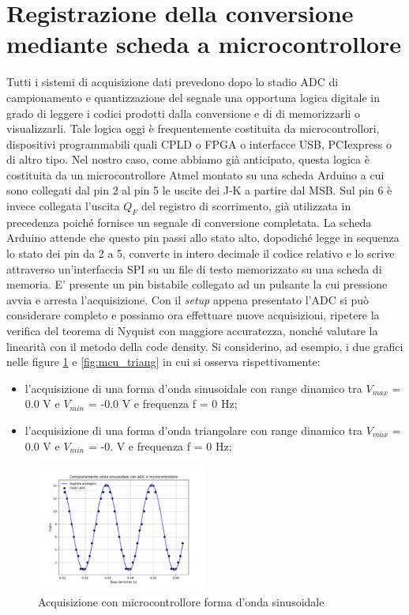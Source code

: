 \documentclass[journal]{IEEEtran}
\begin{document}
\section{Registrazione della conversione mediante scheda a microcontrollore}
Tutti i sistemi di acquisizione dati prevedono dopo lo stadio ADC di campionamento e quantizzazione del segnale una opportuna logica digitale in grado di leggere i codici prodotti dalla conversione e di di memorizzarli o visualizzarli. Tale logica oggi è frequentemente costituita da microcontrollori, dispositivi programmabili quali CPLD o FPGA o interfacce USB, PCIexpress o di altro tipo. Nel nostro caso, come abbiamo già anticipato, questa logica è costituita da un microcontrollore Atmel montato su una scheda Arduino a cui sono collegati dal pin 2 al pin 5 le uscite dei J-K a partire dal MSB. Sul pin 6 è invece collegata l'uscita $Q_F$ del registro di scorrimento, già utilizzata in precedenza poiché fornisce un segnale di conversione completata. La scheda Arduino attende che questo pin passi allo stato alto, dopodiché legge in sequenza lo stato dei pin da 2 a 5, converte in intero decimale il codice relativo e lo scrive attraverso un'interfaccia SPI su un file di testo memorizzato su una scheda di memoria. E' presente un pin bistabile collegato ad un pulsante la cui pressione avvia e arresta l'acquisizione. Con il \textit{setup} appena presentato l'ADC si può considerare completo e possiamo ora effettuare nuove acquisizioni, ripetere la verifica del teorema di Nyquist con maggiore accuratezza, nonché valutare la linearità con il metodo della code density. Si considerino, ad esempio, i due grafici nelle figure \ref{fig:mcu_sine} e \ref{fig:mcu_triang} in cui si osserva rispettivamente:
\begin{itemize}
    \item l'acquisizione di una forma d'onda sinusoidale con range dinamico tra $V_{max}$ = 0.0 V e $V_{min}$ = -0.0 V e frequenza f = 0 Hz;
    \item l'acquisizione di una forma d'onda triangolare con range dinamico tra $V_{max}$ = 0.0 V e $V_{min}$ = -0. V e frequenza f = 0 Hz;
\end{itemize}

\begin{figure}[H]%
\begin{center}
\includegraphics[trim = {0 25 0 0},clip, width=0.50\textwidth]{analysis/output/mcu_sine.pdf}
\caption{Acquisizione con microcontrollore forma d'onda sinusoidale}
\label{fig:mcu_sine}
\end{center}
\end{figure}
\end{document}
